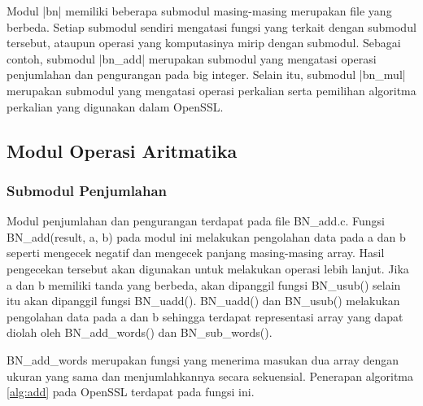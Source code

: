 Modul |bn| memiliki beberapa submodul masing-masing merupakan file yang berbeda. Setiap submodul sendiri mengatasi fungsi yang terkait dengan submodul tersebut, ataupun operasi yang komputasinya mirip dengan submodul. Sebagai contoh, submodul |bn_add| merupakan submodul yang mengatasi operasi penjumlahan dan pengurangan pada big integer. Selain itu, submodul |bn_mul| merupakan submodul yang mengatasi operasi perkalian serta pemilihan algoritma perkalian yang digunakan dalam OpenSSL.

\subsection{Modul Operasi Aritmatika}
\subsubsection{Submodul Penjumlahan}
Modul penjumlahan dan pengurangan terdapat pada file BN\_add.c. Fungsi BN\_add(result, a, b) pada modul ini melakukan pengolahan data pada a dan b seperti mengecek negatif dan mengecek panjang masing-masing array. Hasil pengecekan tersebut akan digunakan untuk melakukan operasi lebih lanjut. Jika a dan b memiliki tanda yang berbeda, akan dipanggil fungsi BN\_usub() selain itu akan dipanggil fungsi BN\_uadd(). BN\_uadd() dan BN\_usub() melakukan pengolahan data pada a dan b sehingga terdapat representasi array yang dapat diolah oleh BN\_add\_words() dan BN\_sub\_words().

BN\_add\_words merupakan fungsi yang menerima masukan dua array dengan ukuran yang sama dan menjumlahkannya secara sekuensial. Penerapan algoritma \ref{alg:add} pada OpenSSL terdapat pada fungsi ini.

